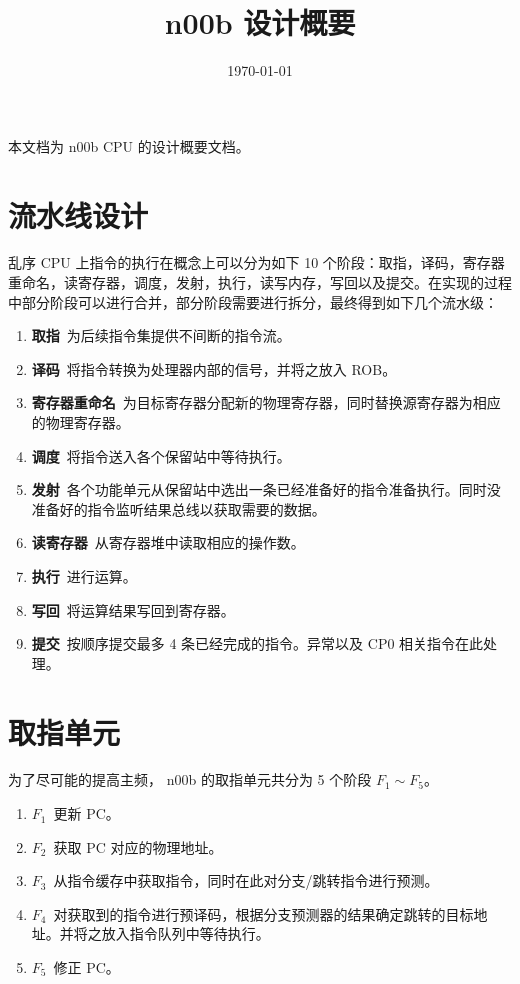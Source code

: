 \documentclass[blue,normal,cn]{elegantnote}
\title{n00b 设计概要}
\date{\today}
\begin{document}
\maketitle
	
本文档为 n00b CPU 的设计概要文档。

\section{流水线设计}

乱序 CPU 上指令的执行在概念上可以分为如下 10 个阶段：取指，译码，寄存器重命名，读寄存器，调度，发射，执行，读写内存，写回以及提交。在实现的过程中部分阶段可以进行合并，部分阶段需要进行拆分，最终得到如下几个流水级：
\begin{enumerate}
	\item \textbf{取指}\ 为后续指令集提供不间断的指令流。
	\item \textbf{译码}\ 将指令转换为处理器内部的信号，并将之放入 ROB。
	\item \textbf{寄存器重命名}\ 为目标寄存器分配新的物理寄存器，同时替换源寄存器为相应的物理寄存器。
	\item \textbf{调度}\ 将指令送入各个保留站中等待执行。
	\item \textbf{发射}\ 各个功能单元从保留站中选出一条已经准备好的指令准备执行。同时没准备好的指令监听结果总线以获取需要的数据。
	\item \textbf{读寄存器}\ 从寄存器堆中读取相应的操作数。
	\item \textbf{执行}\ 进行运算。
	\item \textbf{写回}\ 将运算结果写回到寄存器。
	\item \textbf{提交}\ 按顺序提交最多 4 条已经完成的指令。异常以及 CP0 相关指令在此处理。
\end{enumerate}

\section{取指单元}
为了尽可能的提高主频， n00b 的取指单元共分为 5 个阶段 $F_1 \sim F_5$。

\begin{enumerate}
	\item \textbf{$F_1$}\ 更新 PC。
	\item \textbf{$F_2$}\ 获取 PC 对应的物理地址。
	\item \textbf{$F_3$}\ 从指令缓存中获取指令，同时在此对分支/跳转指令进行预测。
	\item \textbf{$F_4$}\ 对获取到的指令进行预译码，根据分支预测器的结果确定跳转的目标地址。并将之放入指令队列中等待执行。
	\item \textbf{$F_5$}\ 修正 PC。
\end{enumerate}
\end{document}
